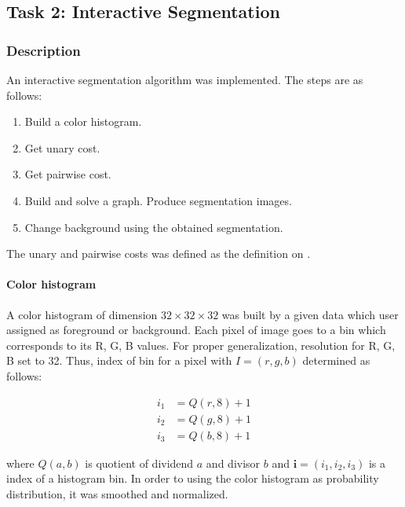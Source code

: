 \documentclass[paper=a4, fontsize=11pt]{scrartcl} %
\numberwithin{equation}{section} %
\numberwithin{figure}{section} %
\numberwithin{table}{section} %
\renewcommand{\vec}[1]{\mathbf{#1}}
\begin{document}
\subsection{Task 2: Interactive Segmentation}

\subsubsection{Description}

An interactive segmentation algorithm was implemented. The steps are as follows:

\begin{enumerate}
	\item Build a color histogram. 
	\item Get unary cost.
	\item Get pairwise cost.
	\item Build and solve a graph. Produce segmentation images. 
	\item Change background using the obtained segmentation. 
\end{enumerate}

The unary and pairwise costs was defined as the definition on \cite{boykov2001interactive}.

\paragraph{Color histogram}

A color histogram of dimension $32 \times 32 \times 32$ was built by a given data which user assigned as foreground or background. Each pixel of image goes to a bin which corresponds to its R, G, B values. For proper generalization, resolution for R, G, B set to 32. Thus, index of bin for a pixel with $I = (r, g, b)$ determined as follows:

\begin{equation}
	\begin{split}
		i_1 &= Q(r, 8) + 1 \\
		i_2 &= Q(g, 8) + 1 \\
		i_3 &= Q(b, 8) + 1 	
	\end{split}
\end{equation}

where $Q(a, b)$ is quotient of dividend $a$ and divisor $b$ and $\vec{i} = (i_1, i_2, i_3)$ is a index of a histogram bin. In order to using the color histogram as probability distribution, it was smoothed and normalized. 
\end{document}
